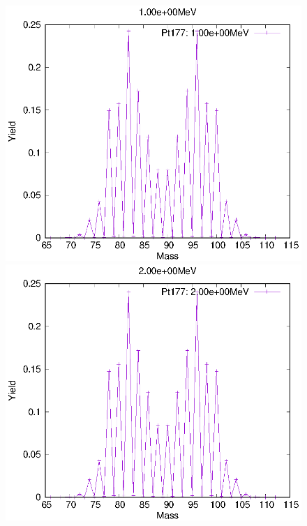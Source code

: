 \begin{figure}[htbp]
 \begin{minipage}{0.33\textwidth} \begin{center} \includegraphics[width=\textwidth]{YA/Pt177_1.00e+00.eps} \end{center} \end{minipage}
\begin{minipage}{0.33\textwidth} \begin{center} \includegraphics[width=\textwidth]{YA/Pt177_2.00e+00.eps} \end{center} \end{minipage}

\end{figure}
